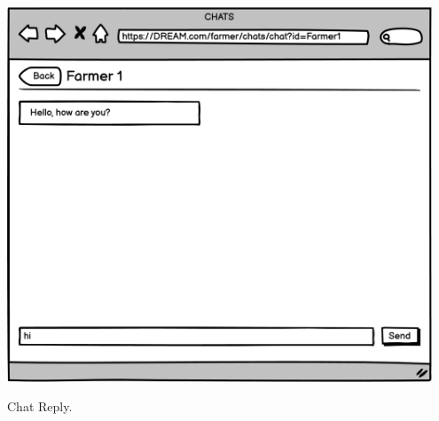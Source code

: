 \vspace{0.5cm}
\begin{minipage}{.5\textwidth}
	\centering
	\includegraphics[width=0.95\textwidth]{Images/Mockup/Farmer/19FarmerChatFarmer1.png}
	\captionsetup{type=figure}
	\caption{Chat Reply.}
\end{minipage}

\newpage

